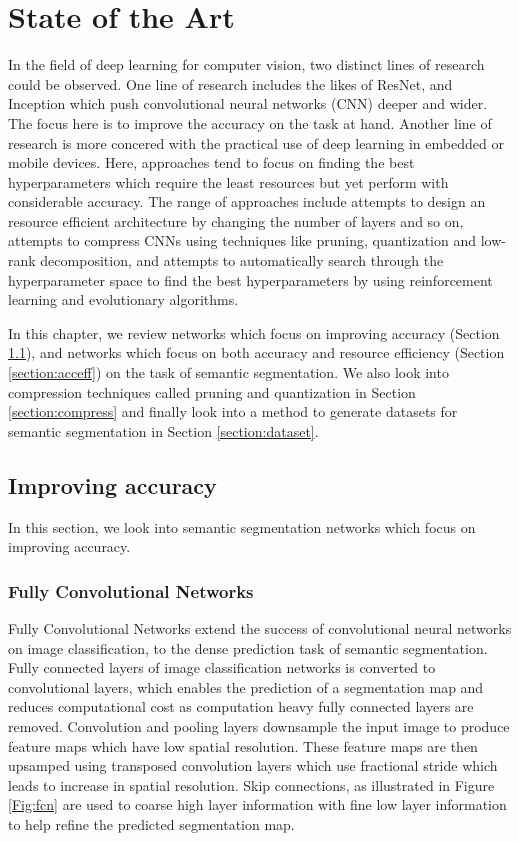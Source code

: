 
\chapter{State of the Art}

In the field of deep learning for computer vision, two distinct lines of research could be observed. One line of research includes the likes of ResNet, and Inception which push convolutional neural networks (CNN) deeper and wider. The focus here is to improve the accuracy on the task at hand. Another line of research is more concered with the practical use of deep learning in embedded or mobile devices. Here, approaches tend to focus on finding the best hyperparameters which require the least resources but yet perform with considerable accuracy. The range of approaches include attempts to design an resource efficient architecture by changing the number of layers and so on, attempts to compress CNNs using techniques like pruning, quantization and low-rank decomposition, and attempts to automatically search through the hyperparameter space to find the best hyperparameters by using reinforcement learning and evolutionary algorithms. 

In this chapter, we review networks which focus on improving accuracy (Section \ref{section:impacc}), and networks which focus on both accuracy and resource efficiency (Section \ref{section:acceff}) on the task of semantic segmentation. We also look into compression techniques called pruning and quantization in Section \ref{section:compress} and finally look into a method to generate datasets for semantic segmentation in Section \ref{section:dataset}.


\section{Improving accuracy}
\label{section:impacc}

In this section, we look into semantic segmentation networks which focus on improving accuracy. 

\subsection{Fully Convolutional Networks}

Fully Convolutional Networks \cite{DBLP:journals/corr/LongSD14} extend the success of convolutional neural networks on image classification, to the dense prediction task of semantic segmentation. Fully connected layers of image classification networks is converted to convolutional layers, which enables the prediction of a segmentation map and reduces computational cost as computation heavy fully connected layers are removed. Convolution and pooling layers downsample the input image to produce feature maps which have low spatial resolution. These feature maps are then upsamped using transposed convolution layers which use fractional stride which leads to increase in spatial resolution. Skip connections, as illustrated in Figure \ref{Fig:fcn} are used to coarse high layer information with fine low layer information to help refine the predicted segmentation map. 

